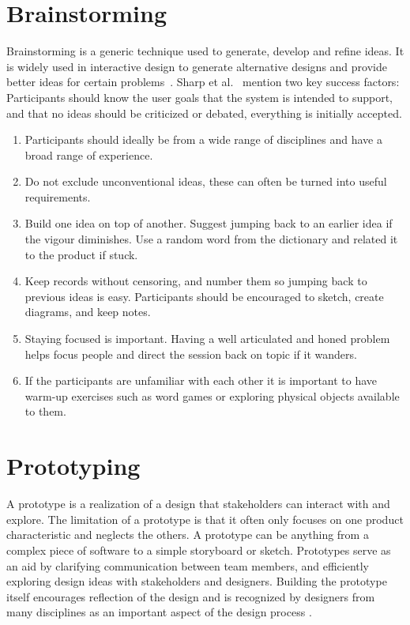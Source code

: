 \section{Brainstorming}
\label{sec:brainstorming}
Brainstorming is a generic technique used to generate, develop and refine ideas. It is widely used in interactive design to generate alternative designs and provide better ideas for certain problems~\cite{interactionDesign}. Sharp et al.~\cite{interactionDesign} mention two key success factors: Participants should know the user goals that the system is intended to support, and that no ideas should be criticized or debated, everything is initially accepted.

\begin{enumerate}
  \item Participants should ideally be from a wide range of disciplines and have a broad range of experience.
  \item Do not exclude unconventional ideas, these can often be turned into useful requirements.
  \item Build one idea on top of another. Suggest jumping back to an earlier idea if the vigour diminishes. Use a random word from the dictionary and related it to the product if stuck.
  \item Keep records without censoring, and number them so jumping back to previous ideas is easy. Participants should be encouraged to sketch, create diagrams, and keep notes.
  \item Staying focused is important. Having a well articulated and honed problem helps focus people and direct the session back on topic if it wanders.
  \item If the participants are unfamiliar with each other it is important to have warm-up exercises such as word games or exploring physical objects available to them.
\end{enumerate}

\section{Prototyping}
A prototype is a realization of a design that stakeholders can interact with and explore. The limitation of a prototype is that it often only focuses on one product characteristic and neglects the others. A prototype can be anything from a complex piece of software to a simple storyboard or sketch. Prototypes serve as an aid by clarifying communication between team members, and efficiently exploring design ideas with stakeholders and designers. Building the prototype itself encourages reflection of the design and is recognized by designers from many disciplines as an important aspect of the design process \cite{interactionDesign}.

